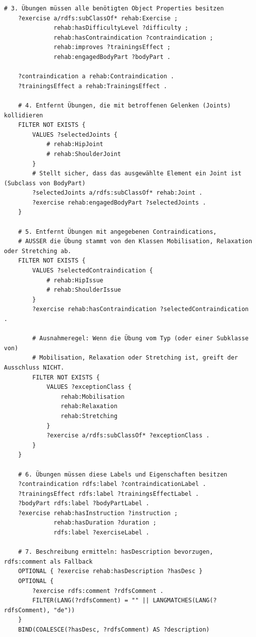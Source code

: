 \begin{lstlisting}[caption={SPARQL-Query der Klasse \texttt{ExerciseAPI} für Planerstellung und Planempfehlung}, label={lst:sparql_exercise}]
    # 3. Übungen müssen alle benötigten Object Properties besitzen
    ?exercise a/rdfs:subClassOf* rehab:Exercise ;
              rehab:hasDifficultyLevel ?difficulty ;
              rehab:hasContraindication ?contraindication ;
              rehab:improves ?trainingsEffect ;
              rehab:engagedBodyPart ?bodyPart .

    ?contraindication a rehab:Contraindication .
    ?trainingsEffect a rehab:TrainingsEffect .

    # 4. Entfernt Übungen, die mit betroffenen Gelenken (Joints) kollidieren
    FILTER NOT EXISTS {
        VALUES ?selectedJoints {
            # rehab:HipJoint
            # rehab:ShoulderJoint
        }
        # Stellt sicher, dass das ausgewählte Element ein Joint ist (Subclass von BodyPart)
        ?selectedJoints a/rdfs:subClassOf* rehab:Joint .
        ?exercise rehab:engagedBodyPart ?selectedJoints .
    }

    # 5. Entfernt Übungen mit angegebenen Contraindications,
    # AUSSER die Übung stammt von den Klassen Mobilisation, Relaxation oder Stretching ab.
    FILTER NOT EXISTS {
        VALUES ?selectedContraindication {
            # rehab:HipIssue
            # rehab:ShoulderIssue
        }
        ?exercise rehab:hasContraindication ?selectedContraindication .

        # Ausnahmeregel: Wenn die Übung vom Typ (oder einer Subklasse von)
        # Mobilisation, Relaxation oder Stretching ist, greift der Ausschluss NICHT.
        FILTER NOT EXISTS {
            VALUES ?exceptionClass {
                rehab:Mobilisation
                rehab:Relaxation
                rehab:Stretching
            }
            ?exercise a/rdfs:subClassOf* ?exceptionClass .
        }
    }

    # 6. Übungen müssen diese Labels und Eigenschaften besitzen
    ?contraindication rdfs:label ?contraindicationLabel .
    ?trainingsEffect rdfs:label ?trainingsEffectLabel .
    ?bodyPart rdfs:label ?bodyPartLabel .
    ?exercise rehab:hasInstruction ?instruction ;
              rehab:hasDuration ?duration ;
              rdfs:label ?exerciseLabel .

    # 7. Beschreibung ermitteln: hasDescription bevorzugen, rdfs:comment als Fallback
    OPTIONAL { ?exercise rehab:hasDescription ?hasDesc }
    OPTIONAL {
        ?exercise rdfs:comment ?rdfsComment .
        FILTER(LANG(?rdfsComment) = "" || LANGMATCHES(LANG(?rdfsComment), "de"))
    }
    BIND(COALESCE(?hasDesc, ?rdfsComment) AS ?description)


\end{lstlisting}
